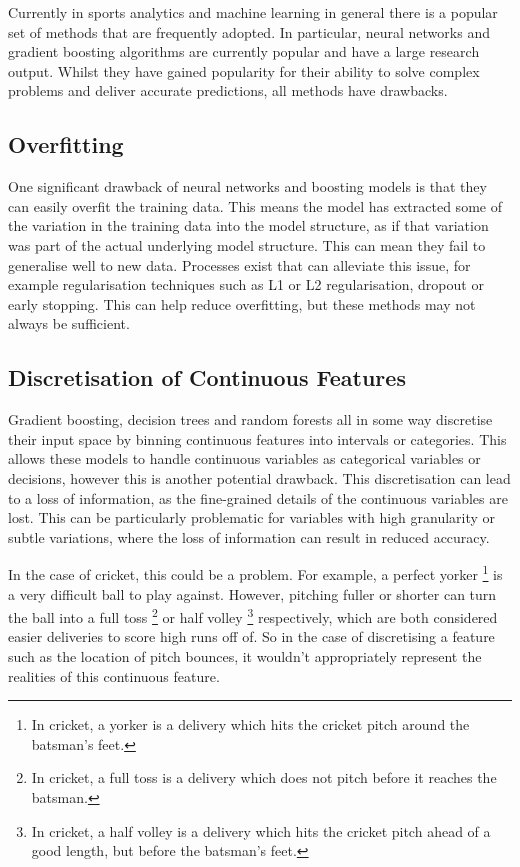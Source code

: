 \documentclass[12pt,a4paper]{report}
\theoremstyle{definition}
\begin{document}
Currently in sports analytics and machine learning in general there is a popular set of methods that are frequently adopted.
In particular, neural networks and gradient boosting algorithms are currently popular and have a large research output.
Whilst they have gained popularity for their ability to solve complex problems and deliver accurate predictions, all methods have drawbacks.

\subsection{Overfitting}

One significant drawback of neural networks and boosting models is that they can easily overfit the training data.
This means the model has extracted some of the variation in the training data into the model structure, as if that variation was part of the actual underlying model structure.
This can mean they fail to generalise well to new data. 
Processes exist that can alleviate this issue, for example regularisation \citep{Girosi1995} techniques such as L1 or L2 regularisation, dropout or early stopping.
This can help reduce overfitting, but these methods may not always be sufficient.

\subsection{Discretisation of Continuous Features} \label{sec:DiscretisingFeatures}

Gradient boosting, decision trees and random forests all in some way discretise their input space by binning continuous features into intervals or categories. 
This allows these models to handle continuous variables as categorical variables or decisions, however this is another potential drawback.
This discretisation can lead to a loss of information, as the fine-grained details of the continuous variables are lost. 
This can be particularly problematic for variables with high granularity or subtle variations, where the loss of information can result in reduced accuracy.

In the case of cricket, this could be a problem.
For example, a perfect yorker \footnote{In cricket, a yorker is a delivery which hits the cricket pitch around the batsman's feet.} is a very difficult ball to play against. 
However, pitching fuller or shorter can turn the ball into a full toss \footnote{In cricket, a full toss is a delivery which does not pitch before it reaches the batsman.} or half volley \footnote{In cricket, a half volley is a delivery which hits the cricket pitch ahead of a good length, but before the batsman's feet.} respectively, which are both considered easier deliveries to score high runs off of.
So in the case of discretising a feature such as the location of pitch bounces, it wouldn't appropriately represent the realities of this continuous feature.
\end{document}
